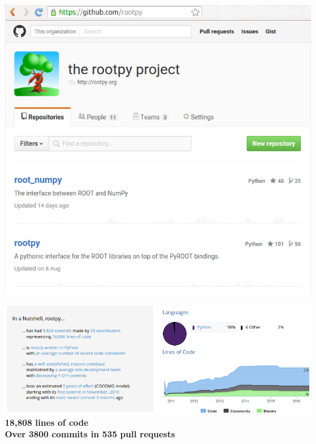 \documentclass[10pt,professionalfonts,serif,usenames,dvipsnames,svgnames,table]{beamer}
\begin{document}
{

\begin{frame}[plain]
    \begin{center}
    \includegraphics[height=\textheight]{figs/rootpy-github.png}
    \end{center}
\end{frame}

\begin{frame}[plain]
    \begin{center}
    \includegraphics[width=\textwidth]{figs/rootpy-stats.png}\\
    
    \vspace{1cm}
    {\bf
    18,808 lines of code\\
    Over 3800 commits in 535 pull requests}
    \end{center}
\end{frame}
}
\end{document}
